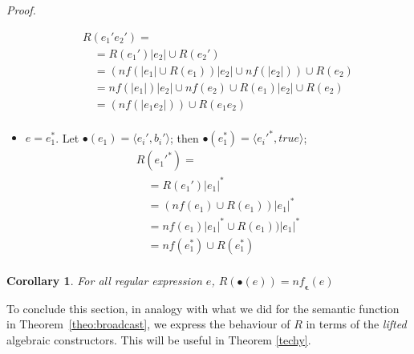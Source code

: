 \documentclass[preprint]{sigplanconf}
\newcommand{\dnf}{\mathit{nf}}
\newcommand{\nf}{\mathit{nf}_{\!\mathbf{\epsilon}}}
\newcounter{item}
\newtheorem{corollary}[item]{Corollary}
\newenvironment{proof}{\begin{trivlist}\item[]{\em Proof.}}{\end{trivlist}}
\begin{document}
\begin{proof}
\begin{itemize}
\[
\begin{array}{l}
R(e_1'e_2')= \\
\quad= R(e_1')|e_2| \cup R(e_2') \\
\quad= (\dnf(|e_1| \cup R(e_1))|e_2| \cup \dnf(|e_2|)) \cup R(e_2)\\
\quad= \dnf(|e_1|)|e_2| \cup \dnf(e_2) \cup R(e_1)|e_2| \cup R(e_2)\\
\quad= (\dnf(|e_1e_2|)) \cup R(e_1e_2)\\
\end{array}
\] 
\item $e = e_1^*$. Let $\bullet(e_1) = \langle e_i',b_i' \rangle$;
then $\bullet(e_1^*) = \langle e_i'^*,true \rangle$;
\[
\begin{array}{l}
R(e_1'^*) = \\
\quad= R(e_1')|e_1|^* \\
\quad= (\dnf(e_1) \cup R(e_1))|e_1|^*\\
\quad= \dnf(e_1)|e_1|^* \cup R(e_1))|e_1|^*\\
\quad= \dnf(e_1^*) \cup R(e_1^*)\\
\end{array}
\] 
\end{itemize}
\end{proof}
\begin{corollary}\label{R-bullet}
For all regular expression $e$,
$
R(\bullet(e)) = \nf(e)
$
\end{corollary}

\noindent
To conclude this section, in analogy with what we did for the 
semantic function in Theorem~\ref{theo:broadcast}, we express the 
behaviour of $R$ in terms of the {\em lifted} algebraic 
constructors. This will be useful in Theorem \ref{techy}.
\end{document}
